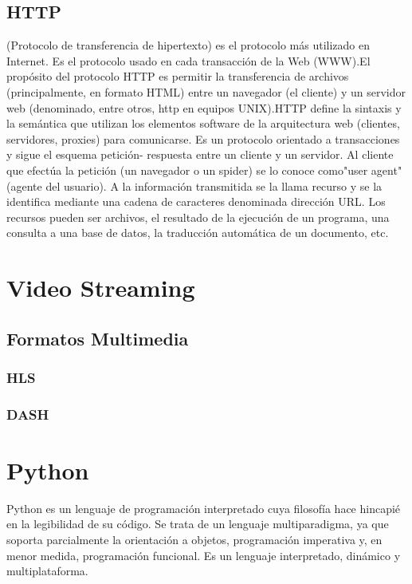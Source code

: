 \subsection{HTTP}
(Protocolo de transferencia de hipertexto) es el protocolo más utilizado en Internet. Es el protocolo usado en cada transacción de la Web (WWW).El propósito del protocolo HTTP es permitir la transferencia de archivos (principalmente, en formato HTML) entre un navegador (el cliente) y un servidor web (denominado, entre otros, http en equipos UNIX).HTTP define la sintaxis y la semántica que utilizan los elementos software de la arquitectura web (clientes, servidores, proxies) para comunicarse. Es un protocolo orientado a transacciones y sigue el esquema petición- respuesta entre un cliente y un servidor. Al cliente que efectúa la petición (un navegador o un spider) se lo conoce como"user agent" (agente del usuario). A la información transmitida se la llama recurso y se la identifica mediante una cadena de caracteres denominada dirección URL. Los recursos pueden ser archivos, el resultado de la ejecución de un programa, una consulta a una base de datos, la traducción automática de un documento, etc.

\section{Video Streaming}

\subsection{Formatos Multimedia}

\subsubsection{HLS}

\subsubsection{DASH}

\section{Python}
Python es un lenguaje de programación interpretado cuya filosofía hace hincapié en la legibilidad de su código. Se trata de un lenguaje multiparadigma, ya que soporta parcialmente la orientación a objetos, programación imperativa y, en menor medida, programación funcional. Es un lenguaje interpretado, dinámico y multiplataforma.\\

